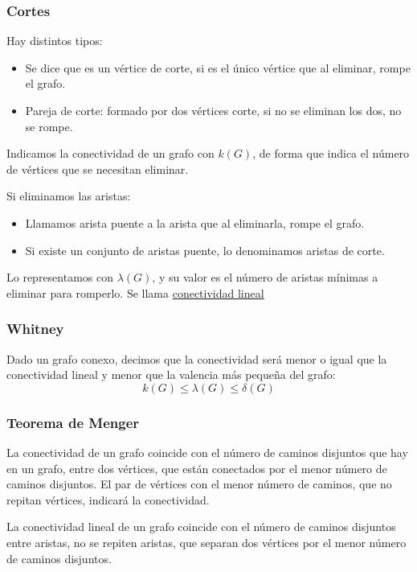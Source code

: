 \subsubsection{Cortes}
Hay distintos tipos:
\begin{itemize}
        \item Se dice que es un vértice de corte, si es el único vértice que al eliminar, rompe el grafo.
        \item Pareja de corte: formado por dos vértices corte, si no se eliminan los dos, no se rompe.
\end{itemize}
Indicamos la conectividad de un grafo con \(k(G)\), de forma que indica el número de vértices que se necesitan eliminar.
\par Si eliminamos las aristas:
\begin{itemize}
        \item Llamamos arista puente a la arista que al eliminarla, rompe el grafo.
        \item Si existe un conjunto de aristas puente, lo denominamos aristas de corte.
\end{itemize}
Lo representamos con \(\lambda(G)\), y su valor es el número de aristas mínimas a eliminar para romperlo. Se llama \underline{conectividad lineal}
\subsubsection{Whitney}
Dado un grafo conexo, decimos que la conectividad será menor o igual que la conectividad lineal y menor que la valencia más pequeña del grafo:
\[
        k(G) \leq \lambda(G) \leq \delta(G)
\]
\subsubsection{Teorema de Menger}
La conectividad de un grafo coincide con el número de caminos disjuntos que hay en un grafo, entre dos vértices, que están conectados por el menor número de caminos disjuntos. El par de vértices con el menor número de caminos, que no repitan vértices, indicará la conectividad.
\par
La conectividad lineal de un grafo coincide con el número de caminos disjuntos entre aristas, no se repiten aristas, que separan dos vértices por el menor número de caminos disjuntos.